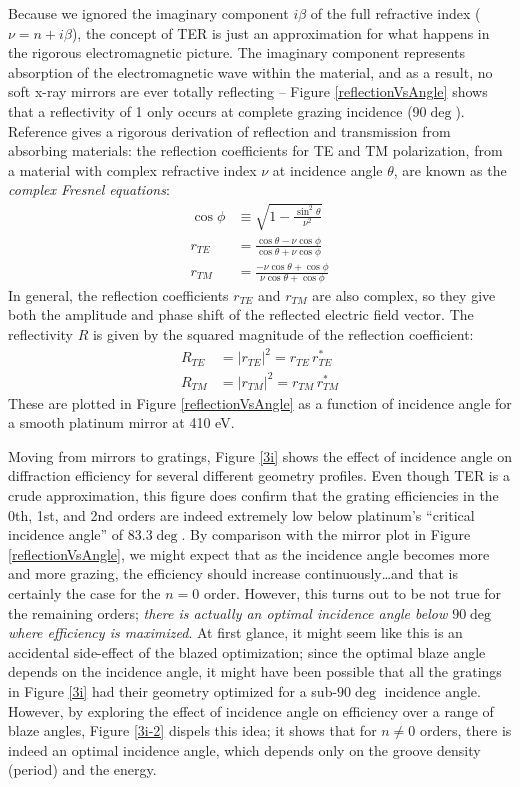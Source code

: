 Because we ignored the imaginary component $i \beta$ of the full refractive index ($\nu = n + i \beta$), the concept of TER is just an approximation for what happens in the rigorous electromagnetic picture.  The imaginary component represents absorption of the electromagnetic wave within the material, and as a result, no soft x-ray mirrors are ever totally reflecting -- Figure \ref{reflectionVsAngle} shows that a reflectivity of 1 only occurs at complete grazing incidence (90$\deg$).  Reference \cite{Fow89} gives a rigorous derivation of reflection and transmission from absorbing materials: the reflection coefficients for TE and TM polarization, from a material with complex refractive index $\nu$ at incidence angle $\theta$, are known as the \emph{complex Fresnel equations}:
\begin{align}
\cos \phi &\equiv \sqrt{1 - \frac{\sin^2 \theta}{\nu^2} } \\
\label{eqnFresnelTE}
r_{TE} &=     \frac{\cos \theta - \nu \cos \phi}     {\cos \theta + \nu \cos \phi} \\
\label{eqnFresnelTM}
r_{TM} &=    \frac{-\nu \cos \theta + \cos \phi}              {\nu \cos \theta + \cos \phi}
\end{align}
In general, the reflection coefficients $r_{TE}$ and $r_{TM}$ are also complex, so they give both the amplitude and phase shift of the reflected electric field vector.  The reflectivity $R$ is given by the squared magnitude of the reflection coefficient:
\begin{align}
R_{TE} &= | r_{TE} | ^2 =  r_{TE} \, r_{TE}^\ast \\
R_{TM} &= | r_{TM} | ^2 = r_{TM} \, r_{TM}^\ast
\end{align}
These are plotted in Figure \ref{reflectionVsAngle} as a function of incidence angle for a smooth platinum mirror at 410 eV.

Moving from mirrors to gratings, Figure \ref{3i} shows the effect of incidence angle on diffraction efficiency for several different geometry profiles.  Even though TER is a crude approximation, this figure does confirm that the grating efficiencies in the 0th, 1st, and 2nd orders are indeed extremely low below platinum's ``critical incidence angle'' of 83.3$\deg$.    By comparison with the mirror plot in Figure \ref{reflectionVsAngle}, we might expect that as the incidence angle becomes more and more grazing, the efficiency should increase continuously\ldots and that is certainly the case for the $n=0$ order.  However, this turns out to be not true for the remaining orders; \emph{there is actually an optimal incidence angle below $90\deg$ where efficiency is maximized}.  At first glance, it might seem like this is an accidental side-effect of the blazed optimization; since the optimal blaze angle depends on the incidence angle, it might have been possible that all the gratings in Figure \ref{3i} had their geometry optimized for a sub-$90\deg$ incidence angle.  However, by exploring the effect of incidence angle on efficiency over a range of blaze angles, Figure \ref{3i-2} dispels this idea; it shows that for $n\neq 0$ orders, there is indeed an optimal incidence angle, which depends only on the groove density (period) and the energy.

